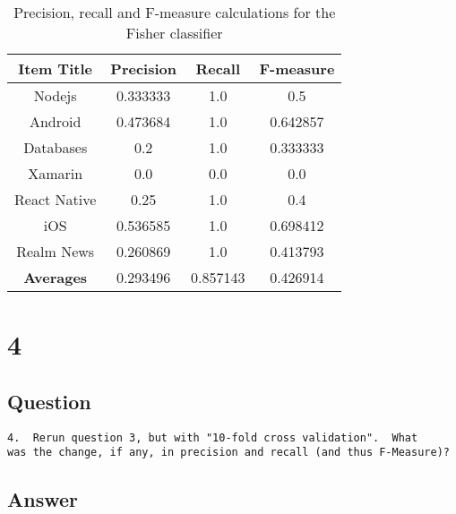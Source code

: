 \documentclass[letterpaper,11pt]{article}
\begin{document}
\begin{table}[h]
\centering
\begin{adjustbox}{max width=\linewidth}
\begin{tabular}{ | c | c | c | c |}
\hline
\textbf{Item Title} & \textbf{Precision} & \textbf{Recall} & \textbf{F-measure} \\
\hline
Nodejs & 0.333333 & 1.0 & 0.5 \\ 
Android & 0.473684 & 1.0 & 0.642857 \\ 
Databases & 0.2 & 1.0 & 0.333333 \\ 
Xamarin & 0.0 & 0.0 & 0.0 \\ 
React Native & 0.25 & 1.0 & 0.4 \\ 
iOS & 0.536585 & 1.0 & 0.698412 \\ 
Realm News & 0.260869 & 1.0 & 0.413793 \\ 
\hline
\textbf{Averages} & 0.293496 & 0.857143 & 0.426914 \\
\hline
\end{tabular}
\end{adjustbox}
\caption{Precision, recall and F-measure calculations for the Fisher classifier}
\label{table:q3calcs}
\end{table}


\clearpage


\section*{4}

\subsection*{Question}

\begin{verbatim}
4.  Rerun question 3, but with "10-fold cross validation".  What
was the change, if any, in precision and recall (and thus F-Measure)?
\end{verbatim}

\subsection*{Answer}
\end{document}

